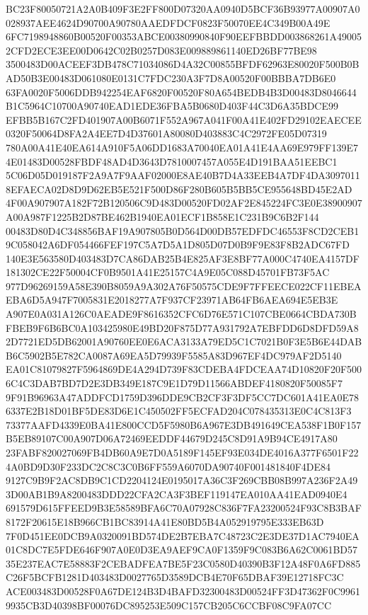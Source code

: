\documentclass[UTF8,fontset=fandol,zihao=-4,a4paper]{ctexart}
\begin{document}
{{BC23F80050721A2A0B409F3E2FF800D07320AA0940D5BCF36B93977A00907A0028937AEE4624D90700A90780AAEDFDCF0823F50070EE4C349B00A49E
6FC7198948860B00520F00353ABCE00380990840F90EEFBBDD003868261A490052CFD2ECE3EE00D0642C02B0257D083E009889861140ED26BF77BE98
3500483D00ACEEF3DB478C71034086D4A32C00855BFDF62963E80020F500B0BAD50B3E00483D061080E0131C7FDC230A3F7D8A00520F00BBBA7DB6E0
63FA0020F5006DDB942254EAF6820F00520F80A654BEDB4B3D00483D8046644B1C5964C10700A90740EAD1EDE36FBA5B0680D403F44C3D6A35BDCE99
EFBB5B167C2FD401907A00B6071F552A967A041F00A41E402FD29102EAECEE0320F50064D8FA2A4EE7D4D37601A80080D403883C4C2972FE05D07319
780A00A41E40EA614A910F5A06DD1683A70040EA01A41E4AA69E979FF139E74E01483D00528FBDF48AD4D3643D7810007457A055E4D191BAA51EEBC1
5C06D05D019187F2A9A7F9AAF02000E8AE40B7D4A33EEB4A7DF4DA30970118EFAECA02D8D9D62EB5E521F500D86F280B605B5BB5CE955648BD45E2AD
4F00A907907A182F72B120506C9D483D00520FD02AF2E845224FC3E0E38900907A00A987F1225B2D87BE462B1940EA01ECF1B858E1C231B9C6B2F144
00483D80D4C348856BAF19A907805B0D564D00DB57EDFDC46553F8CD2CEB19C058042A6DF054466FEF197C5A7D5A1D805D07D0B9F9E83F8B2ADC67FD
140E3E563580D403483D7CA86DAB25B4E825AF3E8BF77A000C4740EA4157DF181302CE22F50004CF0B9501A41E25157C4A9E05C088D45701FB73F5AC
977D96269159A58E390B8059A9A302A76F50575CDE9F7FFEECE022CF11EBEAEBA6D5A947F7005831E2018277A7F937CF23971AB64FB6AEA694E5EB3E
A907E0A031A126C0AEADE9F8616352CFC6D76E571C107CBE0664CBDA730BFBEB9F6B6BC0A103425980E49BD20F875D77A931792A7EBFDD6D8DFD59A8
2D7721ED5DB62001A90760EE0E6ACA3133A79ED5C1C7021B0F3E5B6E44DABB6C5902B5E782CA0087A69EA5D79939F5585A83D967EF4DC979AF2D5140
EA01C81079827F5964869DE4A294D739F83CDEBA4FDCEAA74D10820F20F5006C4C3DAB7BD7D2E3DB349E187C9E1D79D11566ABDEF4180820F50085F7
9F91B96963A47ADDFCD1759D396DDE9CB2CF3F3DF5CC7DC601A41EA0E786337E2B18D01BF5DE83D6E1C450502FF5ECFAD204C078435313E0C4C813F3
73377AAFD4339E0BA41E800CCD5F5980B6A967E3DB491649CEA538F1B0F157B5EB89107C00A907D06A72469EEDDF44679D245C8D91A9B94CE4917A80
23FABF820027069FB4DB60A9E7D0A5189F145EF93E034DE4016A377F6501F224A0BD9D30F233DC2C8C3C0B6FF559A6070DA90740F001481840F4DE84
9127C9B9F2AC8DB9C1CD2204124E0195017A36C3F269CBB08B997A236F2A493D00AB1B9A8200483DDD22CFA2CA3F3BEF119147EA010AA41EAD0940E4
691579D615FFEED9B3E58589BFA6C70A07928C836F7FA23200524F93C8B3BAF8172F20615E18B966CB1BC83914A41E80BD5B4A052919795E333EB63D
7F0D451EE0DCB9A0320091BD574DE2B7EBA7C48723C2E3DE37D1AC7940EA01C8DC7E5FDE646F907A0E0D3EA9AEF9CA0F1359F9C083B6A62C0061BD57
35E237EAC7E58883F2CEBADFEA7BE5F23C0580D40390B3F12A48F0A6FD885C26F5BCFB1281D403483D0027765D3589DCB4E70F65DBAF39E12718FC3C
ACE003483D00528F0A67DE124B3D4BAFD32300483D00524FF3D47362F0C99619935CB3D40398BF00076DC895253E509C157CB205C6CCBF08C9FA07CC
}}
\end{document}
